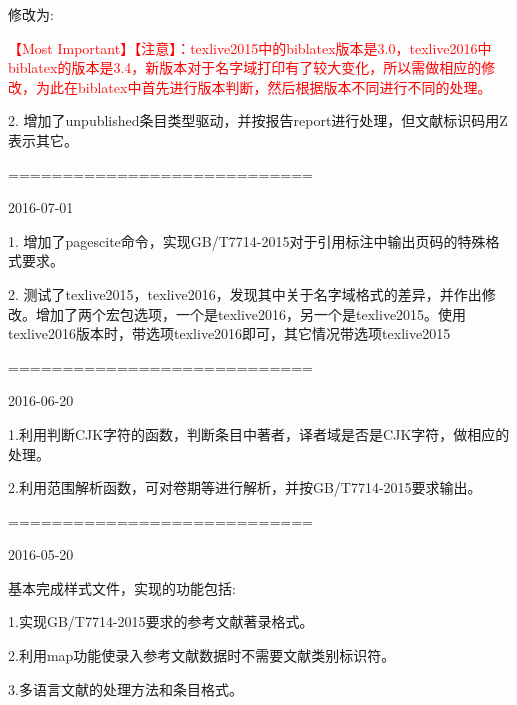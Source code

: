 \documentclass[11pt]{article} %
\begin{document}
修改为:
\begin{texlist}
    \textcolor{red}{\HandRight \heiti 【Most Important】【注意】：texlive2015中的biblatex版本是3.0，texlive2016中biblatex的版本是3.4，新版本对于名字域打印有了较大变化，所以需做相应的修改，为此在biblatex中首先进行版本判断，然后根据版本不同进行不同的处理。}
\end{texlist}

2. 增加了unpublished条目类型驱动，并按报告report进行处理，但文献标识码用Z表示其它。

============================

2016-07-01

1. 增加了pagescite命令，实现GB/T7714-2015对于引用标注中输出页码的特殊格式要求。

2. 测试了texlive2015，texlive2016，发现其中关于名字域格式的差异，并作出修改。增加了两个宏包选项，一个是texlive2016，另一个是texlive2015。使用texlive2016版本时，带选项texlive2016即可，其它情况带选项texlive2015

============================

2016-06-20

1.利用判断CJK字符的函数，判断条目中著者，译者域是否是CJK字符，做相应的处理。

2.利用范围解析函数，可对卷期等进行解析，并按GB/T7714-2015要求输出。


============================

2016-05-20

基本完成样式文件，实现的功能包括:

1.实现GB/T7714-2015要求的参考文献著录格式。

2.利用map功能使录入参考文献数据时不需要文献类别标识符。

3.多语言文献的处理方法和条目格式。
\end{document}
